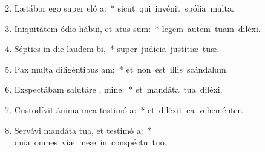 \begin{flushleft}
\begin{enumerate}[leftmargin=*]
\setcounter{enumi}{1}

\item Lætábor ego super eló a:~* \mbox{sicut qui invénit spólia multa.}
\item Iniquitátem ódio hábui, et atus sum:~* \mbox{legem autem tuam diléxi.}
\item Sépties in die laudem  bi,~* \mbox{super judícia justítiæ tuæ.}
\item Pax multa diligéntibus  am:~* \mbox{et non est illis scándalum.}
\item Exspectábam salutáre , mine:~* \mbox{et mandáta tua diléxi.}
\item Custodívit ánima mea testimó a:~* \mbox{et diléxit ea veheménter.}
\item Servávi mandáta tua, et testimó a:~* \mbox{quia omnes viæ meæ in conspéctu tuo.}


\end{enumerate}
\end{flushleft}

